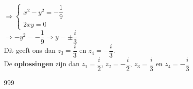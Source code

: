 \documentclass[a4paper]{article}
\begin{document}
$\Rightarrow \left\{\begin{array}{l}
    x^2 - y^2 = -\dfrac{1}{9} \\
    2xy = 0
\end{array}\right.$ \\

$\Rightarrow -y^2 = -\dfrac{1}{9} \Rightarrow y = \pm \dfrac{i}{3}$ \\

Dit geeft ons dan $z_3 = \dfrac{i}{3}$ en $z_4 = -\dfrac{i}{3}$. \\

De \textbf{oplossingen} zijn dan $z_1 = \dfrac{i}{2}$, $z_2 = -\dfrac{i}{2}$, $z_3 = \dfrac{i}{3}$ en $z_4 = -\dfrac{i}{3}$ \\

\begin{thebibliography}{999}
\end{thebibliography}
\end{document}
